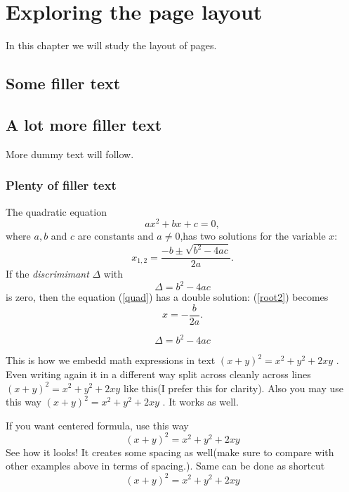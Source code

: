 
\chapter[Chap2Name]{Exploring the page layout}
\begin{flushright} In this chapter we will study the layout of pages. \end{flushright}
\section[SectionName]{Some filler text}
\blindtext
\section[section name]{A lot more filler text}
More dummy text will follow.
\subsection[subsection name]{Plenty of filler text}
\blindtext[3]


The quadratic equation
\begin{equation}\label{quad}
 ax^2 + bx + c = 0,
\end{equation}
where \( a, b \) and \( c \) are constants and \( a \neq 0 \),has two solutions for the variable \( x \):
\begin{equation}\label{root2}
 x_{1,2} = \frac{-b \pm \sqrt{b^2-4ac}}{2a}.
\end{equation}
If the \emph{discrimimant} \( \Delta \) with
\[
 \Delta = b^2 - 4ac
\]
is zero, then the equation (\ref{quad}) has a double solution:
(\ref{root2}) becomes
\[
 x = - \frac{b}{2a}.
\]

$$
 \Delta = b^2 - 4ac
$$


This is how we embedd math expressions in text \begin{math} (x+y)^2 = x^2 + y^2 + 2xy \end{math} . Even writing again it in a different way split across cleanly across lines
\begin{math}
  (x+y)^2 = x^2 + y^2 + 2xy
\end{math}
like this(I prefer this for clarity). Also you may use this way
\(
  (x+y)^2 = x^2 + y^2 + 2xy
\)
 . It works as well.


If you want centered formula, use this way
\begin{displaymath}
  (x+y)^2 = x^2 + y^2 + 2xy
\end{displaymath} See how it looks!  It creates some spacing as well(make sure to compare with other examples above in terms of spacing.). Same can be done as shortcut
\[
  (x+y)^2 = x^2 + y^2 + 2xy
\]


